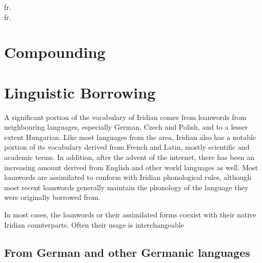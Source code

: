 \ex
{} fr. \\
 fr. \\
\xe

\section{Compounding}\label{sec:compounding}

\section{Linguistic Borrowing}
A significant portion of the vocabulary of Iridian comes from loanwords from neighbouring languages, especially German, Czech and Polish, and to a lesser extent Hungarian. Like most languages from the area, Iridian also has a notable portion of its vocabulary derived from French and Latin, mostly scientific and academic terms. In addition, after the advent of the internet, there has been an increasing amount derived from English and other world languages as well. Most loanwords are assimilated to conform with Iridian phonological rules, although most recent loanwords generally maintain the phonology of the language they were originally borrowed from.

In most cases, the loanwords or their assimilated forms coexist with their native Iridian counterparts. Often their usage is interchangeable

\subsection{From German and other Germanic languages}

